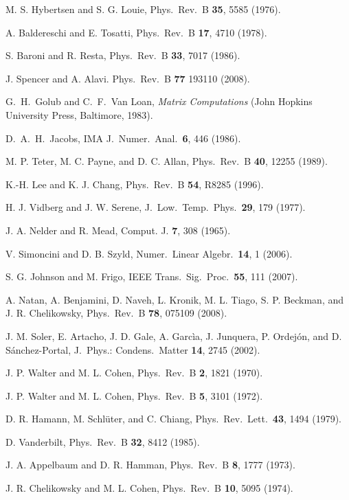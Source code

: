 \documentclass[twocolumn,prb,showpacs,superscriptaddress]{revtex4}
\begin{document}
\begin{thebibliography}{99}
M. S. Hybertsen and S. G. Louie,
Phys.\ Rev.\ B {\bf 35}, 5585 (1976).

A. Baldereschi and E. Tosatti,
Phys.\ Rev.\ B {\bf 17}, 4710 (1978).

S. Baroni and R. Resta,
Phys.\ Rev.\ B {\bf 33}, 7017 (1986).

J. Spencer and A. Alavi.
Phys.\ Rev.\ B {\bf 77} 193110 (2008).

G.\ H.\ Golub and C.\ F.\ Van Loan, {\it Matrix Computations} (John Hopkins University Press, Baltimore, 1983).

D.\ A.\ H.\ Jacobs,
IMA J.\ Numer.\ Anal.\ {\bf 6}, 446 (1986).

M. P. Teter, M. C. Payne, and D. C. Allan,
Phys.\ Rev.\ B {\bf 40}, 12255 (1989).

K.-H. Lee and K. J. Chang,
Phys.\ Rev.\ B {\bf 54}, R8285 (1996).

H. J. Vidberg and J. W. Serene,
J.\ Low.\ Temp.\ Phys.\ {\bf 29}, 179 (1977).

J. A. Nelder and R. Mead,
Comput. J. {\bf 7}, 308 (1965).

V. Simoncini and D. B. Szyld,
Numer.\ Linear Algebr.\ {\bf 14}, 1 (2006).

S. G. Johnson and M. Frigo,
IEEE Trans.\ Sig.\ Proc.\ {\bf 55}, 111 (2007).

A. Natan, A. Benjamini, D. Naveh, L. Kronik, M. L. Tiago, S. P. Beckman, and J. R. Chelikowsky,
Phys.\ Rev.\ B {\bf 78}, 075109 (2008).

J. M. Soler, E. Artacho, J. D. Gale, A. Garc\`ia, J. Junquera, P. Ordej\'on, and D. S\'anchez-Portal,
J.\ Phys.: Condens.\ Matter {\bf 14}, 2745 (2002).

J. P. Walter and M. L. Cohen,
Phys.\ Rev.\ B {\bf 2}, 1821 (1970).

J. P. Walter and M. L. Cohen,
Phys.\ Rev.\ B {\bf 5}, 3101 (1972).

D. R. Hamann, M. Schl\"uter, and C. Chiang,
Phys.\ Rev.\ Lett.\ {\bf 43}, 1494 (1979).

D. Vanderbilt, 
Phys.\ Rev.\ B {\bf 32}, 8412 (1985).

J. A. Appelbaum and D. R. Hamman, 
Phys.\ Rev.\ B {\bf 8}, 1777 (1973).

J. R. Chelikowsky and M. L. Cohen,
Phys.\ Rev.\ B {\bf 10}, 5095 (1974).

\end{thebibliography}
\end{document}
